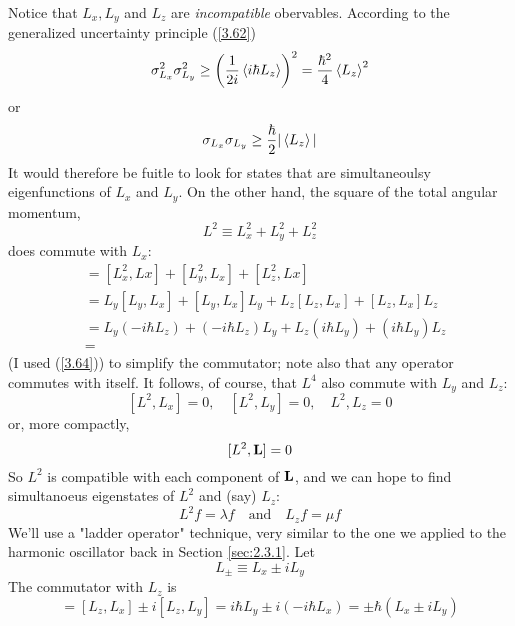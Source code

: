 Notice that $L_x, L_y$ and $L_z$ are \textit{incompatible} obervables. According to the generalized uncertainty principle (\ref{3.62})
\begin{equation*}
	\sigma_{L_x}^2\sigma_{L_y}^2\geq\left(\frac{1}{2i}\expval{i\hbar L_z}\right)^2=\frac{\hbar^2}{4}\expval{L_z}^2
\end{equation*}
or
\begin{equation}\label{4.100}
	\sigma_{L_x}\sigma_{L_y}\geq\frac{\hbar}{2}|\expval{L_z}|
\end{equation}
It would therefore be fuitle to look for states that are simultaneoulsy eigenfunctions of $L_x$ and $L_y$. On the other hand,  the square of the total angular momentum,
\begin{equation}\label{4.101}
	L^2\equiv L_x^2+L_y^2+L_z^2
\end{equation}
does commute with $L_x$:
\begin{align*}
	[L^2,L_x]&=[L_x^2,Lx]+[L_y^2,L_x]+[L_z^2,Lx]\\
					 &=L_y[L_y,L_x]+[L_y,L_x]L_y+L_z[L_z,L_x]+[L_z,L_x]L_z\\
					 &=L_y(-i\hbar L_z)+(-i\hbar L_z)L_y+L_z(i\hbar L_y)+(i\hbar L_y)L_z\\
					 &=
\end{align*}
(I used (\ref{3.64})) to simplify the commutator; note also that any operator commutes with itself. It follows, of course, that $L^4$ also commute with $L_y$ and $L_z$:
\begin{equation}\label{4.102}
	[L^2,L_x]=0,\quad [L^2,L_y]=0,\quad {L^2,L_z}=0
\end{equation}
or, more compactly, 
\begin{equation}\label{4.103}
	[L^2,\vb{L}]=0
\end{equation}
So $L^2$ is compatible with each component of $\vb{L}$, and we can hope to find simultanoeus eigenstates of $L^2$ and (say) $L_z$:
\begin{equation}\label{4.104}
	L^2f=\lambda f\quad \mbox{and}\quad L_zf=\mu f
\end{equation}
We'll use a "ladder operator" technique, very similar to the one we applied to the harmonic oscillator back in Section \ref{sec:2.3.1}. Let
\begin{equation}\label{4.105}
	\boxed{L_{\pm}\equiv L_x\pm iL_y}
\end{equation}
The commutator with $L_z$ is
\begin{equation*}
	[L_z,L_{\pm}]=[L_z,L_x]\pm i[L_z,L_y]=i\hbar L_y\pm i(-i\hbar L_x)=\pm\hbar (L_x\pm iL_y)
\end{equation*}
